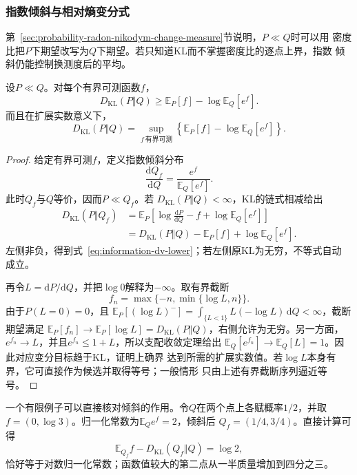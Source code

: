 \subsubsection{指数倾斜与相对熵变分式}
第~\ref{sec:probability-radon-nikodym-change-measure}节说明，\(P\ll Q\)时可以用
密度比把\(P\)下期望改写为\(Q\)下期望。若只知道KL而不掌握密度比的逐点上界，指数
倾斜仍能控制换测度后的平均。
\begin{theorem}
\label{thm:information-donsker-varadhan}
设\(P\ll Q\)。对每个有界可测函数\(f\)，
\begin{equation}
  D_{\mathrm{KL}}(P\Vert Q)
  \geq
  \mathbb{E}_P[f]-\log\mathbb{E}_Q[e^f].
  \label{eq:information-dv-lower}
\end{equation}
而且在扩展实数意义下，
\begin{equation}
  D_{\mathrm{KL}}(P\Vert Q)
  =
  \sup_{f\ \text{有界可测}}
  \left\{
    \mathbb{E}_P[f]-\log\mathbb{E}_Q[e^f]
  \right\}.
  \label{eq:information-dv-variational}
\end{equation}
\end{theorem}
\begin{proof}
给定有界可测\(f\)，定义指数倾斜分布
\[
  \frac{\mathrm{d}Q_f}{\mathrm{d}Q}
  =
  \frac{e^f}{\mathbb{E}_Q[e^f]}.
\]
此时\(Q_f\)与\(Q\)等价，因而\(P\ll Q_f\)。若
\(D_{\mathrm{KL}}(P\Vert Q)<\infty\)，KL的链式相减给出
\[
\begin{aligned}
  D_{\mathrm{KL}}(P\Vert Q_f)
  &=
  \mathbb{E}_P\!\left[
    \log\frac{\mathrm{d}P}{\mathrm{d}Q}
    -f+\log\mathbb{E}_Q[e^f]
  \right]\\
  &=
  D_{\mathrm{KL}}(P\Vert Q)
  -\mathbb{E}_P[f]
  +\log\mathbb{E}_Q[e^f].
\end{aligned}
\]
左侧非负，得到式~\eqref{eq:information-dv-lower}；若左侧原KL为无穷，不等式自动
成立。

再令\(L=\mathrm{d}P/\mathrm{d}Q\)，并把\(\log0\)解释为\(-\infty\)。取有界截断
\[
  f_n=\max\{-n,\min\{\log L,n\}\}.
\]
由于\(P(L=0)=0\)，且
\(\mathbb{E}_P[(\log L)^-]
=\int_{\{L<1\}}L(-\log L)\,\mathrm{d}Q<\infty\)，截断期望满足
\(\mathbb{E}_P[f_n]\to\mathbb{E}_P[\log L]
=D_{\mathrm{KL}}(P\Vert Q)\)，右侧允许为无穷。另一方面，
\(e^{f_n}\to L\)，并且\(e^{f_n}\leq1+L\)，所以支配收敛定理给出
\(\mathbb{E}_Q[e^{f_n}]\to\mathbb{E}_Q[L]=1\)。因此对应变分目标趋于KL，证明上确界
达到所需的扩展实数值。若\(\log L\)本身有界，它可直接作为候选并取得等号；一般情形
只由上述有界截断序列逼近等号。
\end{proof}
一个有限例子可以直接核对倾斜的作用。令\(Q\)在两个点上各赋概率\(1/2\)，并取
\(f=(0,\log3)\)。归一化常数为\(\mathbb{E}_Qe^f=2\)，倾斜后
\(Q_f=(1/4,3/4)\)。直接计算可得
\[
  \mathbb{E}_{Q_f}f-D_{\mathrm{KL}}(Q_f\Vert Q)=\log2,
\]
恰好等于对数归一化常数；函数值较大的第二点从一半质量增加到四分之三。
